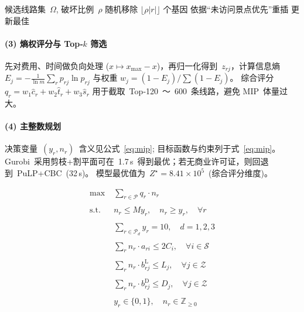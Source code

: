 \documentclass[12pt,a4paper]{article}
\begin{document}
\begin{algorithm}[H]
\caption{LNS 破坏‑重构}\label{alg:lns}
\begin{algorithmic}[1]\small
\Require 候选线路集 $\Omega$, 破坏比例 $\rho$
     \State 随机移除 $\lfloor\rho|r|\rfloor$ 个基因
     \State 依据“未访问景点优先”重插
     \State 更新最佳\EndIf
  \EndFor
\EndFor
\end{algorithmic}
\end{algorithm}

\paragraph{(3) 熵权评分与 Top‑$k$ 筛选}
先对费用、时间做负向处理 ($x\mapsto x_{\max}-x$)，再归一化得到 $z_{rj}$，计算信息熵
\(
E_j=-\frac1{\ln m}\sum_{r}p_{rj}\ln p_{rj}
\)
与权重
\(w_j=(1-E_j)/\sum(1-E_j)\)。
综合评分
\(q_r=w_1\hat c_r+w_2\hat t_r+w_3\hat s_r\)
用于截取 Top‑120 ～ 600 条线路，避免 MIP 体量过大。

\paragraph{(4) 主整数规划}
决策变量 $(y_r,n_r)$ 含义见公式 \eqref{eq:mip}; 目标函数与约束列于式 \eqref{eq:mip}。  
Gurobi 采用剪枝+割平面可在 1.7 s 得到最优；若无商业许可证，则回退到 PuLP+CBC (32 s)。  
模型最优值为 $Z^\star=8.41\times10^5$ (综合评分维度)。

\begin{equation}\label{eq:mip}
\begin{aligned}
\max\;& \sum_{r \in \mathcal{P}} q_r \cdot n_r \\\\
\text{s.t.}\;& n_r \le M y_r,\quad n_r \ge y_r,\quad \forall r \\\\
& \sum_{r \in \mathcal{P}_d} y_r = 10,\quad d = 1,2,3 \\\\
& \sum_{r} n_r \cdot a_{ri} \le 2 C_i,\quad \forall i \in \mathcal{S} \\\\
& \sum_{r} n_r \cdot b_{rj}^{\text{L}} \le L_j,\quad \forall j \in \mathcal{Z} \\\\
& \sum_{r} n_r \cdot b_{rj}^{\text{D}} \le D_j,\quad \forall j \in \mathcal{Z} \\\\
& y_r \in \{0,1\},\quad n_r \in \mathbb{Z}_{\ge0}
\end{aligned}
\end{equation}
\end{document}

